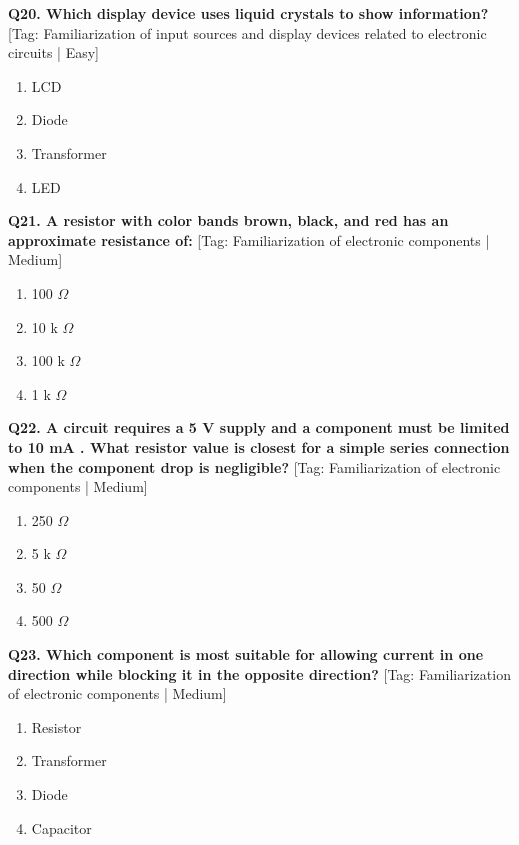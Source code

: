 \noindent\textbf{Q20. Which display device uses liquid crystals to show information?} \hfill [Tag: Familiarization of input sources and display devices related to electronic circuits | Easy]
\begin{enumerate}[label=(\alph*),topsep=2pt,itemsep=1pt,partopsep=0pt,parsep=0pt]
    \item {LCD}
    \item {Diode}
    \item {Transformer}
    \item {LED}
\end{enumerate}
\vspace{2mm}

\noindent\textbf{Q21. A resistor with color bands brown, black, and red has an approximate resistance of:} \hfill [Tag: Familiarization of electronic components | Medium]
\begin{enumerate}[label=(\alph*),topsep=2pt,itemsep=1pt,partopsep=0pt,parsep=0pt]
    \item {100 $\Omega$}
    \item {10 k $\Omega$}
    \item {100 k $\Omega$}
    \item {1 k $\Omega$}
\end{enumerate}
\vspace{2mm}

\noindent\textbf{Q22. A circuit requires a 5 V supply and a component must be limited to 10 mA . What resistor value is closest for a simple series connection when the component drop is negligible?} \hfill [Tag: Familiarization of electronic components | Medium]
\begin{enumerate}[label=(\alph*),topsep=2pt,itemsep=1pt,partopsep=0pt,parsep=0pt]
    \item {250 $\Omega$}
    \item {5 k $\Omega$}
    \item {50 $\Omega$}
    \item {500 $\Omega$}
\end{enumerate}
\vspace{2mm}

\noindent\textbf{Q23. Which component is most suitable for allowing current in one direction while blocking it in the opposite direction?} \hfill [Tag: Familiarization of electronic components | Medium]
\begin{enumerate}[label=(\alph*),topsep=2pt,itemsep=1pt,partopsep=0pt,parsep=0pt]
    \item {Resistor}
    \item {Transformer}
    \item {Diode}
    \item {Capacitor}
\end{enumerate}
\vspace{2mm}

